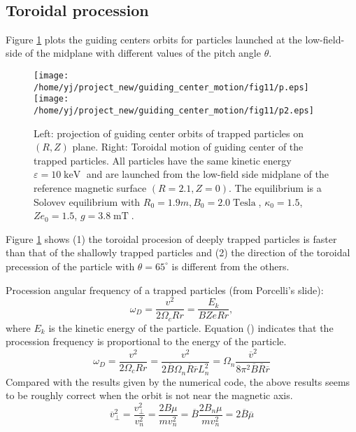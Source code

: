 \documentclass{article}
\newcommand{\tmop}[1]{\ensuremath{\operatorname{#1}}}
\begin{document}
\

\subsection{Toroidal procession}

Figure \ref{1-31-e1} plots the guiding centers orbits for particles launched
at the low-field-side of the midplane with different values of the pitch angle
$\theta$.

\begin{figure}[h]
  \texttt{[image: /home/yj/project\_new/guiding\_center\_motion/fig11/p.eps]}\texttt{[image: /home/yj/project\_new/guiding\_center\_motion/fig11/p2.eps]}
  \caption{\label{1-31-e1}Left: projection of guiding center orbits of trapped
  particles on $(R, Z)$ plane. Right: Toroidal motion of guiding center of the
  trapped particles. All particles have the same kinetic energy $\varepsilon =
  10 \tmop{keV}$ and are launched from the low-field side midplane of the
  reference magnetic surface $(R = 2.1, Z = 0)$. The equilibrium is a Solovev
  equilibrium with $R_0 = 1.9 m, B_0 = 2.0 \tmop{Tesla}$, $\kappa_0 = 1.5$, $Z
  e_0 = 1.5$, $g = 3.8 \tmop{mT}$.}
\end{figure}

Figure \ref{1-31-e1} shows (1) the toroidal procesion of deeply trapped
particles is faster than that of the shallowly trapped particles and (2) the
direction of the toroidal precession of the particle with $\theta =
65^{\circ}$ is different from the others.

Procession angular frequency of a trapped particles (from Porcelli's slide):
\begin{equation}
  \omega_D = \frac{v^2}{2 \Omega_c R r} = \frac{E_k}{B Z e R r},
\end{equation}
where $E_k$ is the kinetic energy of the particle. Equation () indicates that
the procession frequency is proportional to the energy of the particle.
\begin{equation}
  \omega_D = \frac{v^2}{2 \Omega_c R r} = \frac{v^2}{2 \overline{B} \Omega_n
  \overline{R}  \overline{r} L_n^2} = \Omega_n \frac{\overline{v}^2}{8 \pi^2
  \overline{B}  \overline{R}  \overline{r}}
\end{equation}
Compared with the results given by the numerical code, the above results seems
to be roughly correct when the orbit is not near the magnetic axis.
\begin{equation}
  \overline{v}_{\perp}^2 = \frac{v_{\perp}^2}{v_n^2} = \frac{2 B \mu}{m v_n^2}
  = \overline{B} \frac{2 B_n \mu}{m v_n^2} = 2 \overline{B} \overline{\mu}
\end{equation}
\end{document}
